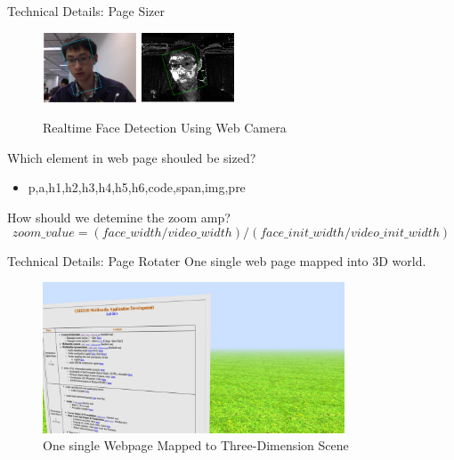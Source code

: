 \documentclass{beamer}
\begin{document}
\begin{frame}{Technical Details: Page Sizer}
\begin{center}
    \begin{figure}
        \includegraphics[width=0.25\textwidth]{./images/face_detection_realtime.png}
        \includegraphics[width=0.25\textwidth]{./images/face_detection_possibility.png}
        \caption{Realtime Face Detection Using Web Camera}
    \end{figure}
\end{center}
Which element in web page shouled be sized?
\begin{itemize}
    \item p,a,h1,h2,h3,h4,h5,h6,code,span,img,pre 
\end{itemize}
How should we detemine the zoom amp?
\begin{equation}
    zoom\_value = (face\_width / video\_width) / (face\_init\_width / video\_init\_width)
\end{equation}
\end{frame}

\begin{frame}{Technical Details: Page Rotater}
One single web page mapped into 3D world.
\begin{center}
    \begin{figure}
        \includegraphics[width=0.8\textwidth]{./images/3d_webpage.png}
        \caption{One single Webpage Mapped to Three-Dimension Scene}
    \end{figure}
\end{center}
\begin{center}
\end{center}
\end{frame}
\end{document}
